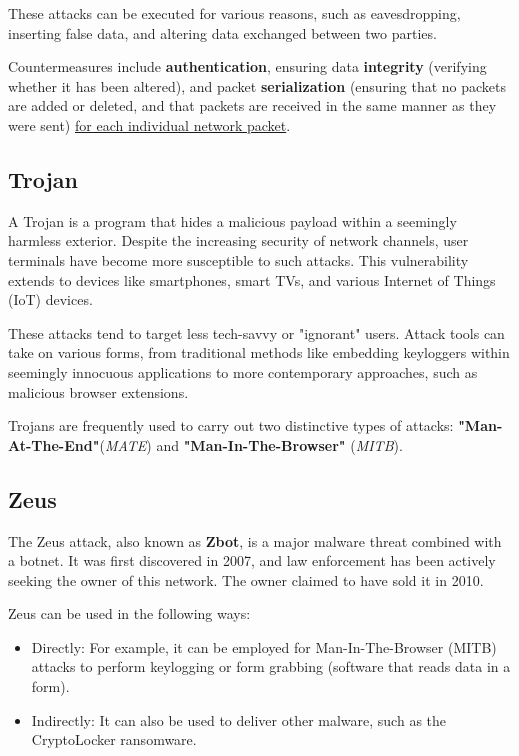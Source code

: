 These attacks can be executed for various reasons, such as eavesdropping, inserting false data, and altering data exchanged between two parties.


Countermeasures include \textbf{authentication}, ensuring data \textbf{integrity} (verifying whether it has been altered), and packet \textbf{serialization} (ensuring that no packets are added or deleted, and that packets are received in the same manner as they were sent) \ul{for each individual network packet}.




\subsection{Trojan}
A Trojan is a program that hides a malicious payload within a seemingly harmless exterior. Despite the increasing security of network channels, user terminals have become more susceptible to such attacks. This vulnerability extends to devices like smartphones, smart TVs, and various Internet of Things (IoT) devices.

These attacks tend to target less tech-savvy or "ignorant" users. Attack tools can take on various forms, from traditional methods like embedding keyloggers within seemingly innocuous applications to more contemporary approaches, such as malicious browser extensions.

Trojans are frequently used to carry out two distinctive types of attacks: \textbf{"Man-At-The-End"}(\emph{MATE}) and \textbf{"Man-In-The-Browser"} (\emph{MITB}).


\subsection{Zeus}
The Zeus attack, also known as \textbf{Zbot}, is a major malware threat combined with a botnet. It was first discovered in 2007, and law enforcement has been actively seeking the owner of this network. The owner claimed to have sold it in 2010.

Zeus can be used in the following ways:
\begin{itemize}
  \item Directly: For example, it can be employed for Man-In-The-Browser (MITB) attacks to perform keylogging or form grabbing (software that reads data in a form).
  \item Indirectly: It can also be used to deliver other malware, such as the CryptoLocker ransomware.
\end{itemize}

